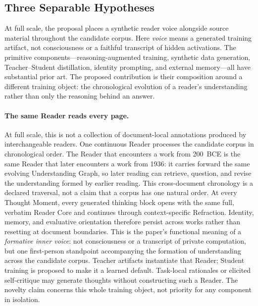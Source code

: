 \documentclass[11pt]{article}
\begin{document}
\subsection{Three Separable Hypotheses}\label{sec:three-hypotheses}

At full scale, the proposal places a synthetic reader voice alongside source
material throughout the candidate corpus. Here \emph{voice} means a generated
training artifact, not consciousness or a faithful transcript of hidden
activations. The primitive components---reasoning-augmented training, synthetic
data generation, Teacher--Student distillation, identity prompting, and external
memory---all have substantial prior art. The proposed contribution is their
composition around a different training object: the chronological evolution of
a reader's understanding rather than only the reasoning behind an answer.

\paragraph{The same Reader reads every page.} At full scale, this is not a
collection of document-local annotations produced by interchangeable readers.
One continuous Reader processes the candidate corpus in chronological order.
The Reader that encounters a work from 200~BCE is the same Reader that later
encounters a work from 1936: it carries forward the same evolving Understanding
Graph, so later reading can retrieve, question, and revise the understanding
formed by earlier reading. This cross-document chronology is a declared
traversal, not a claim that a corpus has one natural order. At every Thought
Moment, every generated thinking
block opens with the same full, verbatim Reader Core and continues through
context-specific Refraction. Identity, memory, and evaluative orientation
therefore persist across works rather than resetting at document boundaries.
This is the paper's functional meaning of a \emph{formative inner voice}: not
consciousness or a transcript of private computation, but one first-person
standpoint accompanying the formation of understanding across the candidate
corpus. Teacher artifacts instantiate that Reader; Student training is proposed
to make it a learned default. Task-local rationales or elicited self-critique
may generate thoughts without constructing such a Reader. The novelty claim
concerns this whole training object, not priority for any component in
isolation.
\end{document}
